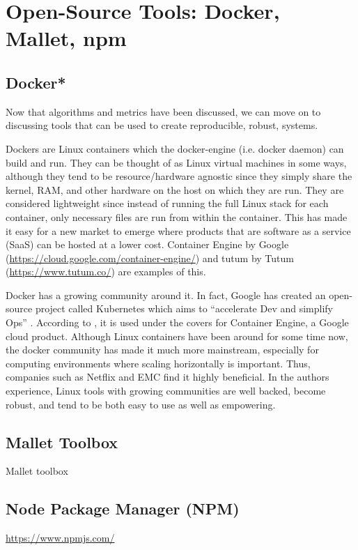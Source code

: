 \label{tools+links}

\section{Open-Source Tools: Docker, Mallet, npm}

\subsection{Docker*}
Now that algorithms and metrics have been discussed, we can move on to discussing tools that can be used to create reproducible, robust, systems.

Dockers are Linux containers which the docker-engine (i.e. docker daemon) can build and run. They can be thought of as Linux virtual machines in some ways, although they tend to be resource/hardware agnostic since they simply share the kernel, RAM, and other hardware on the host on which they are run. They are considered lightweight since instead of running the full Linux stack for each container, only necessary files are run from within the container. This has made it easy for a new market to emerge where products that are software as a service (SaaS) can be hosted at a lower cost. Container Engine by Google (\url{https://cloud.google.com/container-engine/}) and tutum by Tutum (\url{https://www.tutum.co/}) are examples of this.

Docker has a growing community around it. In fact, Google has created an open-source project called Kubernetes which aims to ``accelerate Dev and simplify Ops'' \citep{kube_website}. According to \citet{google_container_engine}, it is used under the covers for Container Engine, a Google cloud product. Although Linux containers have been around for some time now, the docker community has made it much more mainstream, especially for computing environments where scaling horizontally is important. Thus, companies such as Netflix and EMC find it highly beneficial. In the authors experience, Linux tools with growing communities are well backed, become robust, and tend to be both easy to use as well as empowering.

\subsection{Mallet Toolbox}
Mallet toolbox

\subsection{Node Package Manager (NPM)}
 \url{https://www.npmjs.com/}

